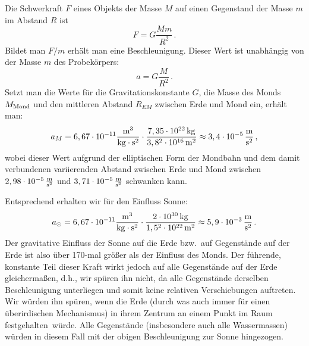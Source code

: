 Die Schwerkraft $F$ eines Objekts der Masse $M$
auf einen Gegenstand der Masse $m$ im Abstand $R$ ist
\begin{equation}
                         F = G \frac{M m}{R^2} \, .
\end{equation} 
Bildet man $F/m$ erh\"alt man eine Beschleunigung. Dieser Wert ist unabh\"angig von der Masse $m$
des \glqq Probek\"orpers\grqq:
\begin{equation}
                         a = G \frac{M}{R^2} \, .
\end{equation} 
Setzt man die Werte f\"ur die Gravitationskonstante $G$, die Masse des Monds $M_{\rm Mond}$
und den mittleren Abstand $R_{EM}$ zwischen Erde und Mond ein, erh\"alt man:
\begin{equation}
                         a_M = 6,67\cdot 10^{-11} \frac{{\rm m}^3}{\rm kg \cdot s^2} 
                         \cdot \frac{7,35 \cdot 10^{22} \, {\rm kg}}{ 3,8^2 \cdot 10^{16}\, {\rm m}^2} 
                         \approx  3,4 \cdot 10^{-5} \, \frac{\rm m}{\rm s^2} \, ,
\end{equation}
wobei dieser Wert aufgrund der elliptischen Form der Mondbahn und dem damit verbundenen variierenden
Abstand zwischen Erde und Mond zwischen $2,98 \cdot 10^{-5}\, \frac{\rm m}{\rm s^2}$ und 
$3,71 \cdot 10^{-5}\, \frac{\rm m}{\rm s^2}$ schwanken kann.

Entsprechend erhalten wir f\"ur den Einfluss Sonne: 
\begin{equation}
                         a_\odot = 6,67\cdot 10^{-11} \frac{{\rm m}^3}{\rm kg \cdot s^2} 
                         \cdot \frac{2 \cdot 10^{30} \, {\rm kg}}{ 1,5^2 \cdot 10^{22}\, {\rm m}^2} 
                         \approx 5,9 \cdot 10^{-3}  \, \frac{\rm m}{\rm s^2}  \, .
\end{equation} 
Der gravitative Einfluss der Sonne auf die Erde bzw.\ auf Gegenst\"ande auf der Erde ist also 
\"uber 170-mal gr\"o\ss er als der Einfluss des Monds. Der f\"uhrende, konstante Teil 
dieser Kraft wirkt jedoch auf alle
Gegenst\"ande auf der Erde gleicherma\ss en, d.h., wir sp\"uren ihn nicht, da alle Gegenst\"ande
derselben Beschleunigung unterliegen und somit keine relativen Verschiebungen auftreten. 
Wir w\"urden ihn sp\"uren, wenn die Erde (durch was auch immer f\"ur einen \"uberirdischen 
Mechanismus) in ihrem Zentrum an einem Punkt im Raum
\glqq festgehalten\grqq\ w\"urde. Alle Gegenst\"ande (insbesondere auch alle Wassermassen)
w\"urden in diesem Fall mit der obigen Beschleunigung zur Sonne hingezogen. 

